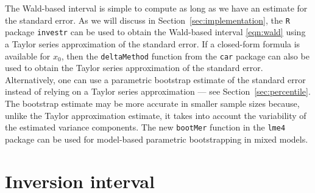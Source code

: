 \documentclass{article}\usepackage[]{graphicx}\usepackage[]{color}
\begin{document}
The Wald-based interval is simple to compute as long as we have an estimate for the standard error.  As we will discuss in Section~\ref{sec:implementation}, the \texttt{R} package \texttt{investr} \citep{investr-package} can be used to obtain the Wald-based interval \eqref{eqn:wald} using a Taylor series approximation of the standard error.  If a closed-form formula is available for $\widehat{x}_0$, then the \texttt{deltaMethod} function from the \texttt{car} package \citep{fox-car-2011} can also be used to obtain the Taylor series approximation of the standard error.  Alternatively, one can use a parametric bootstrap estimate of the standard error instead of relying on a Taylor series approximation --- see Section~\ref{sec:percentile}.  The bootstrap estimate may be more accurate in smaller sample sizes because, unlike the Taylor approximation estimate, it takes into account the variability of the estimated variance components.  The new \texttt{bootMer} function in the \texttt{lme4} package \citep{bates-lme4-2014} can be used for model-based parametric bootstrapping in mixed models.



\section{Inversion interval}\label{sec:inversion}
\end{document}
